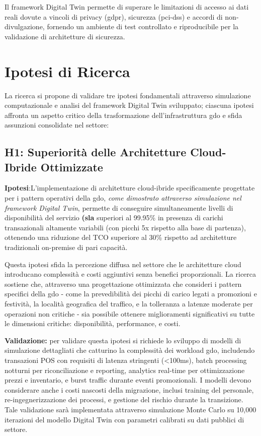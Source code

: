 Il framework Digital Twin permette di superare le limitazioni di accesso ai dati reali dovute a vincoli di privacy (\gls{gdpr}), sicurezza (\gls{pci-dss}) e accordi di non-divulgazione, fornendo un ambiente di test controllato e riproducibile per la validazione di architetture di sicurezza.

\section{Ipotesi di Ricerca}
\label{sec:ipotesi_ricerca}

La ricerca si propone di validare tre ipotesi fondamentali attraverso 
simulazione computazionale e analisi del framework Digital Twin sviluppato; ciascuna ipotesi affronta un aspetto critico della trasformazione dell'infrastruttura \gls{gdo} e sfida assunzioni consolidate nel settore:

\subsection{H1: Superiorità delle Architetture Cloud-Ibride Ottimizzate}

\label{ssec:h1}
\textbf{Ipotesi}:L'implementazione di architetture cloud-ibride specificamente progettate per i pattern operativi della \gls{gdo}, \textit{come dimostrato attraverso 
simulazione nel framework Digital Twin}, permette di conseguire simultaneamente livelli di disponibilità del servizio \textbf{(\gls{sla}} superiori al 99.95\% in presenza di carichi transazionali altamente variabili (con picchi 5x rispetto alla base di partenza), ottenendo una riduzione del TCO superiore al 30\% rispetto ad architetture tradizionali on-premise di pari capacità.

Questa ipotesi sfida la percezione diffusa nel settore che le architetture cloud introducano complessità e costi aggiuntivi senza benefici proporzionali. La ricerca sostiene che, attraverso una progettazione ottimizzata che consideri i pattern specifici della \gls{gdo} - come la prevedibilità dei picchi di carico legati a promozioni e festività, la località geografica del traffico, e la tolleranza a latenze moderate per operazioni non critiche - sia possibile ottenere miglioramenti significativi su tutte le dimensioni critiche: disponibilità, performance, e costi.

\textbf{Validazione:} per validare questa ipotesi si richiede lo sviluppo di modelli di simulazione dettagliati che catturino la complessità dei workload \gls{gdo}, includendo transazioni POS con requisiti di latenza stringenti (<100ms), batch processing notturni per riconciliazione e reporting, analytics real-time per ottimizzazione prezzi e inventario, e burst traffic durante eventi promozionali. I modelli devono considerare anche i costi nascosti della migrazione, inclusi training del personale, re-ingegnerizzazione dei processi, e gestione del rischio durante la transizione. Tale validazione sarà implementata attraverso simulazione Monte Carlo su 10,000 iterazioni del modello Digital Twin con parametri calibrati su dati pubblici di settore.

